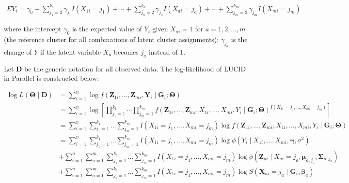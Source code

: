 \begin{equation}
    \begin{aligned}
E Y_{i}=\gamma_{0}+\sum_{j_{1}=2}^{k_{1}} \gamma_{j_{1}} I\left(X_{1 i}=j_{1}\right)+\cdots+\sum_{j_{a}=2}^{k_{a}} \gamma_{j_{a}} I\left(X_{a i}=j_{a}\right)+\cdots+\sum_{j_{m}=2}^{k_{m}} \gamma_{j_{m}} I\left(X_{m i}=j_{m}\right)
\end{aligned}
    \label{eq_24}
\end{equation}

where the intercept $\gamma_{0}$ is the expected value of $Y_{i}$ given $X_{a i}=1$ for $a=1,2,\ldots, m$ (the reference cluster for all combinations of latent cluster assignments); $\gamma_{j_{a}}$ is the change of $Y$ if the latent variable $X_{a}$ becomes $j_{a}$ instead of 1.

Let $\boldsymbol{D}$ be the generic notation for all observed data. The log-likelihood of LUCID in Parallel is constructed below:

\begin{equation}
   \begin{aligned}
\log L(\bm{\Theta}\mid \boldsymbol{D}) &  =\sum_{i=1}^{n} \log f\left(\boldsymbol{Z}_{1 i}, \ldots, \boldsymbol{Z}_{m i}, \boldsymbol{Y}_{i} \mid \boldsymbol{G}_{i} ; \boldsymbol{\Theta}\right) \\
& =\sum_{i=1}^{n} \log \left[\prod_{j_{1}=1}^{k_{1}} \cdots \prod_{j_{m}=1}^{k_{m}} f\left(\boldsymbol{Z}_{1 i}, \ldots, \boldsymbol{Z}_{m i}, X_{1 i}, \ldots, X_{m i}, Y_{i} \mid \boldsymbol{G}_{i} ; \boldsymbol{\Theta}\right)^{I\left(X_{1 i}=j_{1}, \ldots, X_{m i}=j_{m}\right)}\right] \\
& =\sum_{i=1}^{n} \sum_{j_{1}=1}^{k_{1}} \ldots \sum_{j_{m}=1}^{k_{m}} I\left(X_{1 i}=j_{1}, \ldots, X_{m i}=j_{m}\right) \log f\left(\boldsymbol{Z}_{1 i}, \ldots, \boldsymbol{Z}_{m i}, X_{1 i}, \ldots, X_{m i}, Y_{i} \mid \boldsymbol{G}_{i} ; \boldsymbol{\Theta}\right) \\
& =\sum_{i=1}^{n} \sum_{j_{1}=1}^{k_{1}} \ldots \sum_{j_{m}=1}^{k_{m}} I\left(X_{1 i}=j_{1}, \ldots, X_{m i}=j_{m}\right) \log \phi\left(Y_{i} \mid X_{1 i}, \ldots, X_{m i}, \boldsymbol{\gamma}, \sigma^{2}\right) \\
& +\sum_{i=1}^{n} \sum_{a=1}^{m} \sum_{j_{1}=1}^{k_{1}} \ldots \sum_{j_{m}=1}^{k_{m}} I\left(X_{1 i}=j_{1}, \ldots, X_{m i}=j_{m}\right) \log \phi\left(\boldsymbol{Z}_{a i} \mid X_{a i}=j_{a}, \boldsymbol{\mu}_{a,j_{a}}, \boldsymbol{\Sigma}_{a,j_{a}}\right) \\
& +\sum_{i=1}^{n} \sum_{a=1}^{m} \sum_{j_{1}=1}^{k_{1}} \ldots \sum_{j_{m}=1}^{k_{m}} I\left(X_{1 i}=j_{1}, \ldots, X_{m i}=j_{m}\right) \log S\left(\boldsymbol{X}_{a i}=j_{a} \mid \boldsymbol{G}_{i}, \boldsymbol{\beta}_{a}\right)
\end{aligned}
    \label{eq_26}
\end{equation}

